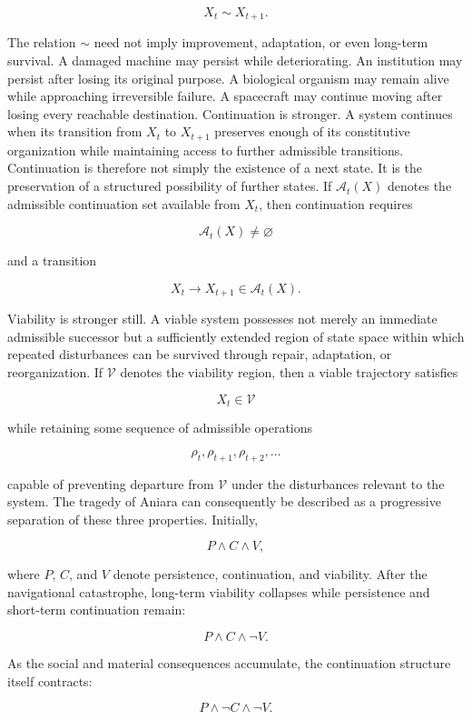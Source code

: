 \documentclass[11pt,oneside]{book}
\theoremstyle{definition}
\theoremstyle{remark}
\begin{document}
\[
X_t\sim X_{t+1}.
\]

The relation \(\sim\) need not imply improvement, adaptation, or even long-term survival. A damaged
machine may persist while deteriorating. An institution may persist after losing its original
purpose. A biological organism may remain alive while approaching irreversible failure. A spacecraft
may continue moving after losing every reachable destination. Continuation is stronger. A system
continues when its transition from \(X_t\) to \(X_{t+1}\) preserves enough of its constitutive
organization while maintaining access to further admissible transitions. Continuation is therefore
not simply the existence of a next state. It is the preservation of a structured possibility of
further states. If \(\mathcal{A}_t(X)\) denotes the admissible continuation set available from
\(X_t\), then continuation requires

\[
\mathcal{A}_t(X)\neq\varnothing
\]

and a transition

\[
X_t\rightarrow X_{t+1}\in\mathcal{A}_t(X).
\]

Viability is stronger still. A viable system possesses not merely an immediate admissible successor
but a sufficiently extended region of state space within which repeated disturbances can be survived
through repair, adaptation, or reorganization. If \(\mathcal{V}\) denotes the viability region, then
a viable trajectory satisfies

\[
X_t\in\mathcal{V}
\]

while retaining some sequence of admissible operations

\[
\rho_t,\rho_{t+1},\rho_{t+2},\ldots
\]

capable of preventing departure from \(\mathcal{V}\) under the disturbances relevant to the system.
The tragedy of Aniara can consequently be described as a progressive separation of these three
properties. Initially,

\[
P\land C\land V,
\]

where \(P\), \(C\), and \(V\) denote persistence, continuation, and viability. After the
navigational catastrophe, long-term viability collapses while persistence and short-term
continuation remain:

\[
P\land C\land\neg V.
\]

As the social and material consequences accumulate, the continuation structure itself contracts:

\[
P\land\neg C\land\neg V.
\]
\end{document}
